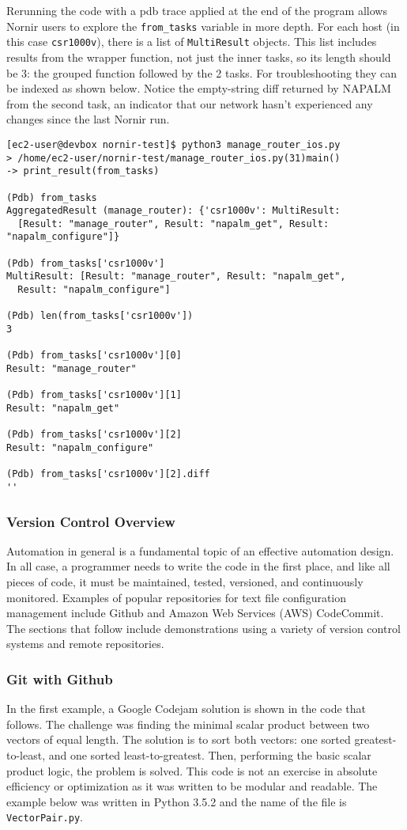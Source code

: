 Rerunning the code with a pdb trace applied at the end of the program allows
Nornir users to explore the \verb|from_tasks| variable in more depth. For each
host (in this case \verb|csr1000v|), there is a list of \verb|MultiResult| objects.
This list includes results from the wrapper function, not just the inner tasks, so
its length should be 3: the grouped function followed by the 2 tasks. For
troubleshooting they can be indexed as shown below. Notice the empty-string
diff returned by NAPALM from the second task, an indicator that our network
hasn't experienced any changes since the last Nornir run.

\begin{verbatim}
[ec2-user@devbox nornir-test]$ python3 manage_router_ios.py
> /home/ec2-user/nornir-test/manage_router_ios.py(31)main()
-> print_result(from_tasks)

(Pdb) from_tasks
AggregatedResult (manage_router): {'csr1000v': MultiResult:
  [Result: "manage_router", Result: "napalm_get", Result: "napalm_configure"]}

(Pdb) from_tasks['csr1000v']
MultiResult: [Result: "manage_router", Result: "napalm_get",
  Result: "napalm_configure"]

(Pdb) len(from_tasks['csr1000v'])
3

(Pdb) from_tasks['csr1000v'][0]
Result: "manage_router"

(Pdb) from_tasks['csr1000v'][1]
Result: "napalm_get"

(Pdb) from_tasks['csr1000v'][2]
Result: "napalm_configure"

(Pdb) from_tasks['csr1000v'][2].diff
''
\end{verbatim}

\subsubsection{Version Control Overview}
Automation in general is a fundamental topic of an effective automation
design. In all case, a programmer needs to write the code in the first
place, and like all pieces of code, it must be maintained, tested, versioned,
and continuously monitored. Examples of popular repositories for text file
configuration management include Github and Amazon Web Services (AWS) CodeCommit.
The sections that follow include demonstrations using a variety of version
control systems and remote repositories.

\subsubsection{Git with Github}
In the first example, a Google Codejam solution is shown in the code that
follows. The challenge was finding the minimal scalar product between two
vectors of equal length. The solution is to sort both vectors: one sorted
greatest-to-least, and one sorted least-to-greatest. Then, performing the
basic scalar product logic, the problem is solved. This code is not an
exercise in absolute efficiency or optimization as it was written to be
modular and readable. The example below was written in Python 3.5.2 and
the name of the file is \verb|VectorPair.py|.

